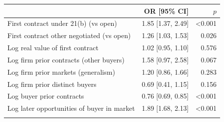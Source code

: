 \begin{tabular}{@{}lrr@{}}
\toprule
 & OR [95\% CI] & $p$\\
\midrule
First contract under 21(b) (vs open) & 1.85 [1.37, 2.49] & <0.001\\
First contract other negotiated (vs open) & 1.26 [1.03, 1.53] & 0.026\\
Log real value of first contract & 1.02 [0.95, 1.10] & 0.576\\
Log firm prior contracts (other buyers) & 1.58 [0.97, 2.58] & 0.067\\
Log firm prior markets (generalism) & 1.20 [0.86, 1.66] & 0.283\\
Log firm prior distinct buyers & 0.69 [0.41, 1.15] & 0.156\\
Log buyer prior contracts & 0.76 [0.69, 0.85] & <0.001\\
Log later opportunities of buyer in market & 1.89 [1.68, 2.13] & <0.001\\
\botrule
\end{tabular}